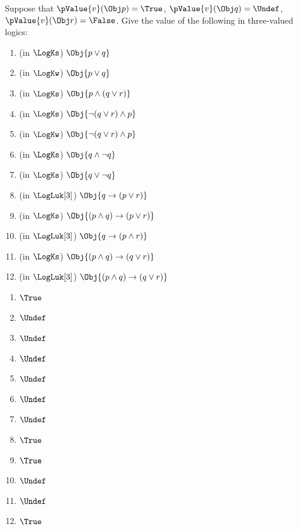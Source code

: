 \documentclass[../../../../include/open-logic-section]{subfiles}
\begin{document}


\begin{prob}[Evaluations]
Suppose that $\pValue{v}(\Obj p)=\True$, $\pValue{v}(\Obj q)=\Undef$, $\pValue{v}(\Obj r)=\False$.
Give the value of the following in three-valued logics:
\begin{enumerate}
\item (in $\LogKs$) $\Obj{p \lor q}$
\item (in $\LogKw$) $\Obj{p \lor q}$
\item (in $\LogKs$) $\Obj{p\land(q\lor r)}$
\item (in $\LogKs$) $\Obj{\lnot(q\lor r)\land p}$
\item (in $\LogKw$) $\Obj{\lnot(q\lor r)\land p}$
\item (in $\LogKs$) $\Obj{q\land\lnot q}$
\item (in $\LogKs$) $\Obj{q\lor\lnot q}$
\item (in $\LogLuk[3]$) $\Obj{q\rightarrow(p\lor r)}$
\item (in $\LogKs$) $\Obj{(p\land q)\rightarrow(p\lor r)}$ 
\item (in $\LogLuk[3]$) $\Obj{q\rightarrow(p\land r)}$
\item (in $\LogKs$) $\Obj{(p\land q)\rightarrow(q\lor r)}$ 
\item (in $\LogLuk[3]$) $\Obj{(p\land q)\rightarrow(q\lor r)}$
\end{enumerate}
\begin{ans}
\begin{enumerate}
	\item $\True$
	\item $\Undef$
	\item $\Undef$
	\item $\Undef$
	\item $\Undef$
	\item $\Undef$
	\item $\Undef$
	\item $\True$
	\item $\True$
	\item $\Undef$
	\item $\Undef$
	\item $\True$
\end{enumerate}
\end{ans}
\end{prob}
\end{document}
